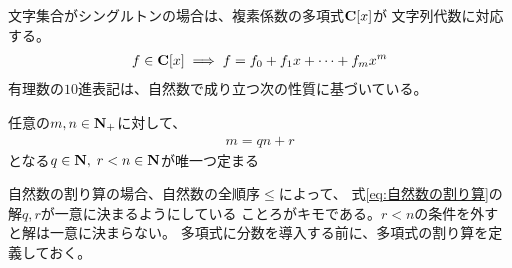 	文字集合がシングルトンの場合は、複素係数の多項式$\mathbf{C}[x]$が
	文字列代数に対応する。
	\begin{equation*}\begin{split}
		f\in\mathbf{C}[x] \implies f = f_0 + f_1x + \cdots + f_mx^m
	\end{split}\end{equation*}
	有理数の$10$進表記は、自然数で成り立つ次の性質に基づいている。

	\begin{proposition}[自然数の割り算]\label{prop:自然数の割り算} %
		任意の$m,n\in\mathbf{N}_+$に対して、
		\begin{equation}\label{eq:自然数の割り算}\begin{split}
			m = qn + r
		\end{split}\end{equation}
		となる$q\in\mathbf{N},\;r<n\in\mathbf{N}$が唯一つ定まる
	\end{proposition} %

	自然数の割り算の場合、自然数の全順序$\le$によって、
	式\eqref{eq:自然数の割り算}の解$q,r$が一意に決まるようにしている
	ことろがキモである。$r<n$の条件を外すと解は一意に決まらない。
	多項式に分数を導入する前に、多項式の割り算を定義しておく。

